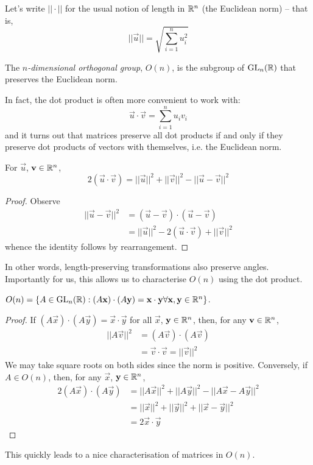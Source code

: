 \documentclass{../../template/note}
\begin{document}
    Let's write \(||\cdot||\) for the usual notion of length in \(\mathbb R^n\) (the Euclidean norm) -- that is,
    \[
        ||\vec u|| = \sqrt{\sum_{i=1}^n u_i^2}
    \]

    \begin{definition}
        The \emph{\(n\)-dimensional orthogonal group}, \(O(n)\), is the subgroup of \(\operatorname{GL}_n(\mathbb R)\) that preserves the Euclidean norm.
    \end{definition}
    In fact, the dot product is often more convenient to work with:
    \[
        \vec u \cdot \vec v = \sum_{i=1}^n u_iv_i
    \]
    and it turns out that matrices preserve all dot products if and only if they preserve dot products of vectors with themselves, i.e. the Euclidean norm.

    \begin{lemma}
        For \(\vec u\), \(\vec v \in \RR^n\),
        \[
            2(\vec u \cdot \vec v) = ||\vec u||^2 + ||\vec v||^2 - ||\vec u - \vec v||^2
        \]
    \end{lemma}
    
    \begin{proof}
        Observe
        \begin{align*}
            ||\vec u - \vec v||^2 &= (\vec u - \vec v) \cdot (\vec u - \vec v) \\
            &= ||\vec u||^2 - 2(\vec u \cdot \vec v) + ||\vec v||^2
        \end{align*}
        whence the identity follows by rearrangement.
    \end{proof}
    In other words, length-preserving transformations also preserve angles. Importantly for us, this allows us to characterise \(O(n)\) using the dot product.
    \begin{lemma}
        \(O(n) = \{A \in \GL_n(\RR) : (A \vec x) \cdot (A \vec y) = \vec x \cdot \vec y \forall \vec x, \vec y \in \RR^n\}\).
    \end{lemma}
    
    \begin{proof}
        If \((A \vec x) \cdot (A \vec y) = \vec x \cdot \vec y\) for all \(\vec x\), \(\vec y \in \RR^n\), then, for any \(\vec v \in \RR^n\),
        \begin{align*}
            ||A \vec v||^2 &= (A \vec v) \cdot (A \vec v) \\
            &= \vec v \cdot \vec v = ||\vec v||^2
        \end{align*}
        We may take square roots on both sides since the norm is positive. Conversely, if \(A \in O(n)\), then, for any \(\vec x\), \(\vec y \in \RR^n\),
        \begin{align*}
            2(A \vec x) \cdot (A \vec y) &= ||A \vec x||^2 + ||A \vec y||^2 - ||A \vec x - A \vec y||^2 \\
            &= ||\vec x||^2 + ||\vec y||^2 + ||\vec x - \vec y||^2 \\
            &= 2 \vec x \cdot \vec y
        \end{align*}
    \end{proof}
    This quickly leads to a nice characterisation of matrices in \(O(n)\).
\end{document}
